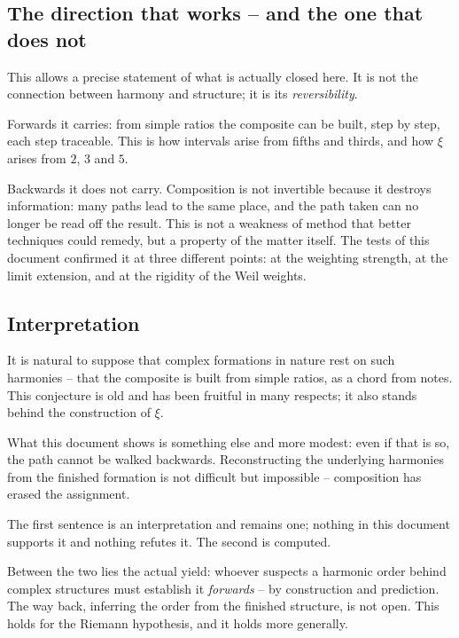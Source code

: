 \subsection{The direction that works -- and the one that does not}

This allows a precise statement of what is actually closed here. It is
not the connection between harmony and structure; it is its
\emph{reversibility}.

Forwards it carries: from simple ratios the composite can be built,
step by step, each step traceable. This is how intervals arise from
fifths and thirds, and how $\xi$ arises from $2$, $3$ and $5$.

Backwards it does not carry. Composition is not invertible because it
destroys information: many paths lead to the same place, and the path
taken can no longer be read off the result. This is not a weakness of
method that better techniques could remedy, but a property of the
matter itself. The tests of this document confirmed it at three
different points: at the weighting strength, at the limit extension,
and at the rigidity of the Weil weights.

\subsection{Interpretation}

\begin{highlight}
It is natural to suppose that complex formations in nature rest on such
harmonies -- that the composite is built from simple ratios, as a chord
from notes. This conjecture is old and has been fruitful in many
respects; it also stands behind the construction of $\xi$.

What this document shows is something else and more modest: even if
that is so, the path cannot be walked backwards. Reconstructing the
underlying harmonies from the finished formation is not difficult but
impossible -- composition has erased the assignment.
\end{highlight}

The first sentence is an interpretation and remains one; nothing in
this document supports it and nothing refutes it. The second is
computed.

Between the two lies the actual yield: whoever suspects a harmonic
order behind complex structures must establish it \emph{forwards} --
by construction and prediction. The way back, inferring the order from
the finished structure, is not open. This holds for the Riemann
hypothesis, and it holds more generally.

